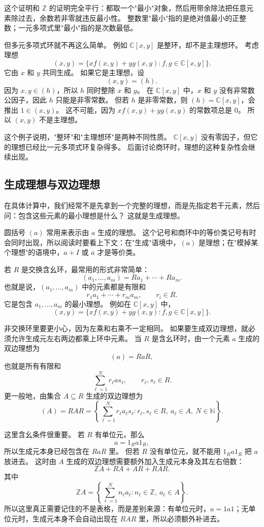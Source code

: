 这个证明和 $\mathbb Z$ 的证明完全平行：都取一个"最小"对象，然后用带余除法把任意元素除过去，余数若非零就违反最小性。
整数里"最小"指的是绝对值最小的正整数；一元多项式里"最小"指的是次数最低。

但多元多项式环就不再这么简单。
例如 $\mathbb C[x,y]$ 是整环，却不是主理想环。
考虑理想
\[
(x,y)=\{xf(x,y)+yg(x,y):f,g\in\mathbb C[x,y]\}.
\]
它由 $x$ 和 $y$ 共同生成。
如果它是主理想，设
\[
(x,y)=(h).
\]
因为 $x,y\in(h)$，所以 $h$ 同时整除 $x$ 和 $y$。
在 $\mathbb C[x,y]$ 中，$x$ 和 $y$ 没有非常数公因子，因此 $h$ 只能是非零常数。
但若 $h$ 是非零常数，则 $(h)=\mathbb C[x,y]$，会推出 $1\in(x,y)$。
这不可能，因为 $xf(x,y)+yg(x,y)$ 的常数项总是 $0$。
所以 $(x,y)$ 不是主理想。

这个例子说明，"整环"和"主理想环"是两种不同性质。
$\mathbb C[x,y]$ 没有零因子，但它的理想已经比一元多项式环复杂得多。
后面讨论商环时，理想的这种复杂性会继续出现。

\subsection{生成理想与双边理想}\label{sec:generated-two-sided-ideals}

在具体计算中，我们经常不是先拿到一个完整的理想，而是先指定若干元素，然后问：包含这些元素的最小理想是什么？
这就是生成理想。

圆括号 $(a)$ 常用来表示由 $a$ 生成的理想。
这个记号和商环中的等价类记号有时会同时出现，所以阅读时要看上下文：在"生成"语境中，$(a)$ 是理想；在"模掉某个理想"的语境中，$a+I$ 或 $\overline a$ 才是等价类。

若 $R$ 是交换含幺环，最常用的形式非常简单：
\[
(a_1,\dots,a_m)=Ra_1+\cdots+Ra_m.
\]
也就是说，$(a_1,\dots,a_m)$ 中的元素都是有限和
\[
r_1a_1+\cdots+r_ma_m,\qquad r_i\in R.
\]
它是包含 $a_1,\dots,a_m$ 的最小理想。
例如在 $\mathbb C[x,y]$ 中，
\[
(x,y)=\{xf(x,y)+yg(x,y):f,g\in\mathbb C[x,y]\}.
\]

非交换环里要更小心，因为左乘和右乘不一定相同。
如果要生成双边理想，就必须允许生成元左右两边都乘上环中元素。
当 $R$ 是含幺环时，由一个元素 $a$ 生成的双边理想为
\[
(a)=RaR,
\]
也就是所有有限和
\[
\sum_{\ell=1}^N r_\ell a s_\ell,\qquad r_\ell,s_\ell\in R.
\]
更一般地，由集合 $A\subseteq R$ 生成的双边理想为
\[
(A)=RAR
=\left\{\sum_{\ell=1}^N r_\ell a_\ell s_\ell:
r_\ell,s_\ell\in R,\ a_\ell\in A,\ N\in\mathbb N\right\}.
\]

这里含幺条件很重要。
若 $R$ 有单位元，那么
\[
a=1_Ra1_R,
\]
所以生成元本身已经包含在 $RaR$ 里。
但若 $R$ 没有单位元，就不能用 $1_Ra1_R$ 把 $a$ 放进去。
这时由 $A$ 生成的双边理想需要额外加入生成元本身及其左右倍数：
\[
\mathbb ZA+RA+AR+RAR.
\]
其中
\[
\mathbb ZA
=\left\{\sum_{\ell=1}^N n_\ell a_\ell:
n_\ell\in\mathbb Z,\ a_\ell\in A\right\}.
\]
所以这里真正需要记住的不是表格，而是差别来源：有单位元时，$a=1a1$；无单位元时，生成元本身不会自动出现在 $RAR$ 里，所以必须额外补进去。

